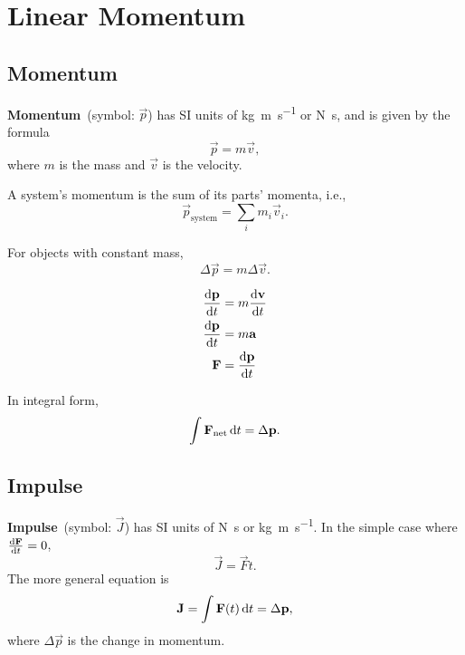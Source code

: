 \chapter{Linear Momentum}


\section{Momentum}

\textbf{Momentum}~(symbol: \(\vec{p}\)) has SI units of \unit{\kilogram
\metre \per \second}
or \unit{\newton \second},
and is given by the formula
\begin{equation}
    \vec{p} = m \vec{v},
\end{equation}
where \(m\) is the mass and \(\vec{v}\) is the velocity.

A system's momentum is the sum of its parts' momenta, i.e.,
\begin{equation}
    \vec{p}_\mathrm{system} = \sum_i m_i \vec{v}_i.
\end{equation}

For objects with constant mass,
\begin{equation}
    \Delta{\vec{p}} = m \Delta{\vec{v}}.
\end{equation}

\begin{equation} \label{eq:force-momentum}
    \begin{aligned}
        \odv{\vec{p}}{t} &= m \odv{\vec{v}}{t} \\
        \odv{\vec{p}}{t} &= m \vec{a} \\
        \vec{F} &= \odv{\vec{p}}{t}
    \end{aligned}
\end{equation}

In integral form,
\begin{equation}
    \int \vec{F}_\mathrm{net} \odif{t} = \Delta{\vec{p}}.
\end{equation}

\section{Impulse}

\textbf{Impulse}~(symbol: \(\vec{J}\)) has SI units of \unit{\newton \second}
or \unit{\kilogram \metre \per \second}.
In the simple case where \(\odv{\vec{F}}{t} = 0\),
\begin{equation}
    \vec{J} = \vec{F} t.
\end{equation}
The more general equation is
\begin{equation}
    \vec{J} = \int \vec{F}(t) \odif{t} = \Delta{\vec{p}},
\end{equation}
where \(\Delta{\vec{p}}\) is the change in momentum.

